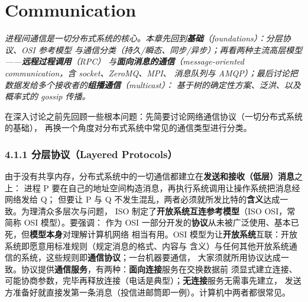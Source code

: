 \chapter{Communication}
\begin{center}
\begin{minipage}{0.9\textwidth}
\itshape\small\color{dsgray}
进程间通信是一切分布式系统的核心。本章先回到\textbf{基础}（foundations）：分层协议、OSI 参考模型
与通信分类（持久/瞬态、同步/异步）；再看两种主流高层模型——\textbf{远程过程调用}（RPC）
与\textbf{面向消息的通信}（message-oriented communication，含 socket、ZeroMQ、MPI、
消息队列与 AMQP）；最后讨论把数据发给多个接收者的\textbf{组播通信}（multicast）：
基于树的确定性方案、泛洪、以及概率式的 gossip 传播。
\end{minipage}
\end{center}


在深入讨论之前先回顾一些根本问题：先简要讨论网络通信协议（一切分布式系统的基础），
再换一个角度对分布式系统中常见的通信类型进行分类。

\subsection*{4.1.1 分层协议（Layered Protocols）}
由于没有共享内存，分布式系统中的一切通信都建立在\textbf{发送和接收（低层）消息}之上：
进程 P 要在自己的地址空间构造消息，再执行系统调用让操作系统把消息经网络发给 Q；
但要让 P 与 Q 不发生混乱，两者必须就所发比特的\textbf{含义}达成一致。为理清众多层次与问题，
ISO 制定了\textbf{开放系统互连参考模型}（ISO OSI，常简称 OSI 模型）。要强调：
作为 OSI 一部分开发的\textbf{协议}从未被广泛使用、基本已死，但\textbf{模型本身}对理解计算机网络
相当有用。OSI 模型为让\textbf{开放系统}互联：开放系统即愿意用标准规则（规定消息的格式、内容与
含义）与任何其他开放系统通信的系统，这些规则即\textbf{通信协议}；一台机器要通信，
大家须就所用协议达成一致。协议提供\textbf{通信服务}，有两种：\textbf{面向连接}服务在交换数据前
须显式建立连接、可能协商参数，完毕再释放连接（电话是典型）；\textbf{无连接}服务无需事先建立，
发送方准备好就直接发第一条消息（投信进邮筒即一例）。计算机中两者都很常见。

